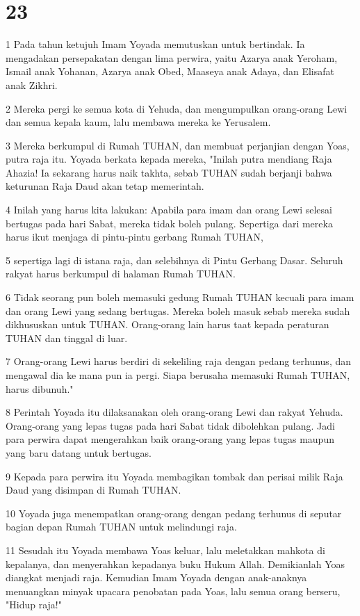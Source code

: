 \chapter{23}

\par 1 Pada tahun ketujuh Imam Yoyada memutuskan untuk bertindak. Ia mengadakan persepakatan dengan lima perwira, yaitu Azarya anak Yeroham, Ismail anak Yohanan, Azarya anak Obed, Maaseya anak Adaya, dan Elisafat anak Zikhri.
\par 2 Mereka pergi ke semua kota di Yehuda, dan mengumpulkan orang-orang Lewi dan semua kepala kaum, lalu membawa mereka ke Yerusalem.
\par 3 Mereka berkumpul di Rumah TUHAN, dan membuat perjanjian dengan Yoas, putra raja itu. Yoyada berkata kepada mereka, "Inilah putra mendiang Raja Ahazia! Ia sekarang harus naik takhta, sebab TUHAN sudah berjanji bahwa keturunan Raja Daud akan tetap memerintah.
\par 4 Inilah yang harus kita lakukan: Apabila para imam dan orang Lewi selesai bertugas pada hari Sabat, mereka tidak boleh pulang. Sepertiga dari mereka harus ikut menjaga di pintu-pintu gerbang Rumah TUHAN,
\par 5 sepertiga lagi di istana raja, dan selebihnya di Pintu Gerbang Dasar. Seluruh rakyat harus berkumpul di halaman Rumah TUHAN.
\par 6 Tidak seorang pun boleh memasuki gedung Rumah TUHAN kecuali para imam dan orang Lewi yang sedang bertugas. Mereka boleh masuk sebab mereka sudah dikhususkan untuk TUHAN. Orang-orang lain harus taat kepada peraturan TUHAN dan tinggal di luar.
\par 7 Orang-orang Lewi harus berdiri di sekeliling raja dengan pedang terhunus, dan mengawal dia ke mana pun ia pergi. Siapa berusaha memasuki Rumah TUHAN, harus dibunuh."
\par 8 Perintah Yoyada itu dilaksanakan oleh orang-orang Lewi dan rakyat Yehuda. Orang-orang yang lepas tugas pada hari Sabat tidak dibolehkan pulang. Jadi para perwira dapat mengerahkan baik orang-orang yang lepas tugas maupun yang baru datang untuk bertugas.
\par 9 Kepada para perwira itu Yoyada membagikan tombak dan perisai milik Raja Daud yang disimpan di Rumah TUHAN.
\par 10 Yoyada juga menempatkan orang-orang dengan pedang terhunus di seputar bagian depan Rumah TUHAN untuk melindungi raja.
\par 11 Sesudah itu Yoyada membawa Yoas keluar, lalu meletakkan mahkota di kepalanya, dan menyerahkan kepadanya buku Hukum Allah. Demikianlah Yoas diangkat menjadi raja. Kemudian Imam Yoyada dengan anak-anaknya menuangkan minyak upacara penobatan pada Yoas, lalu semua orang berseru, "Hidup raja!"
